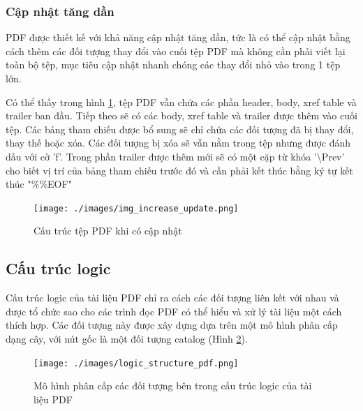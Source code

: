 \documentclass[./../main.tex]{subfiles}
\begin{document}
\subsubsection*{Cập nhật tăng dần}
PDF được thiết kế với khả năng cập nhật tăng dần, tức là có thể cập nhật bằng cách thêm các đối tượng thay đổi vào cuối tệp PDF mà không cần phải viết lại toàn bộ tệp, mục tiêu cập nhật nhanh chóng các thay đổi nhỏ vào trong 1 tệp lớn.

Có thể thấy trong hình \ref{fig:update}, tệp PDF vẫn chứa các phần header, body, xref table và trailer ban đầu. Tiếp theo sẽ có các body, xref table và trailer được thêm vào cuối tệp. Các bảng tham chiếu được bổ sung sẽ chỉ chứa các đối tượng đã bị thay đổi, thay thế  hoặc xóa. Các đối tượng bị xóa sẽ vẫn nằm trong tệp nhưng được đánh dấu với cờ 'f'.  Trong phần trailer được thêm mới sẽ có một cặp từ khóa '\textbackslash Prev' cho biết vị trí của bảng tham chiếu trước đó và cần phải kết thúc bằng ký tự kết thúc "\%\%EOF"
\begin{figure}[ht!]
	\centering
	\texttt{[image: ./images/img\_increase\_update.png]}
	\caption{Cấu trúc tệp PDF khi có cập nhật }
	\label{fig:update}
\end{figure}
\subsection{Cấu trúc logic}

Cấu trúc logic của tài liệu PDF chỉ ra cách các đối tượng liên kết với nhau và được tổ chức sao cho các trình đọc PDF có thể hiểu và xử lý tài liệu một cách thích hợp. Các đối tượng này được xây dựng dựa trên một mô hình phân cấp dạng cây, với nút gốc là một đối tượng catalog (Hình \ref{fig:logic_structure}).

\begin{figure}[ht!]
	\centering
	\texttt{[image: ./images/logic\_structure\_pdf.png]}
	\caption{Mô hình phân cấp các đối tượng bên trong cấu trúc logic của tài liệu PDF \protect\footnotemark}
	\label{fig:logic_structure}
\end{figure}

\end{document}
